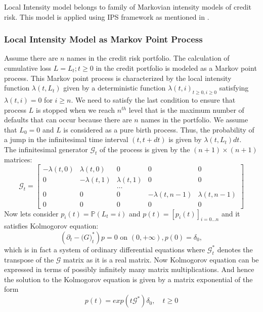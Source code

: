 Local Intensity model belongs to family of Markovian intensity models of credit risk.  This model is applied using IPS framework as mentioned in \cite{carmona2009importance}.
\subsubsection{Local Intensity Model as Markov Point Process}
 Assume there are $n$ names in the credit risk portfolio. The calculation of cumulative loss $L = {L_{t};t \geq 0}$ in the credit portfolio is modeled as a Markov point process. This Markov point process is characterized by the local intensity function $\lambda(t,L_{t})$ given by a deterministic function ${\lambda(t,i)}_{t \geq 0,i \geq 0}$ satisfying $\lambda(t,i) = 0$ for $ i \geq n$. We need to satisfy the last condition to ensure that process $L$ is stopped when we reach $n^{th}$ level that is the maximum number of defaults that can occur because there are $n$ names in the portfolio. We assume that $L_{0} = 0$ and $L$ is considered as a pure birth process. Thus, the probability of a jump in the infinitesimal time interval $(t,t+dt)$ is given by $\lambda(t,L_{t})dt$. \\
The infinitesimal generator $\mathcal{G}_{t}$ of the process is given by the $(n+1) \times (n+1)$ matrices: \\
\[\mathcal{G}_{t} = 
	\begin{bmatrix}
-\lambda(t,0)& \lambda(t,0) & 0 & 0 & 0 \\
0 & -\lambda(t,1)& \lambda(t,1)  & 0 & 0 \\
 & &\dots & & \\
 0 & 0 & 0 & -\lambda(t,n-1)& \lambda(t,n-1) \\
 0 & 0 & 0 & 0 & 0
\end{bmatrix}
\]
Now lets consider $p_{i}(t) = \mathbb{P}({L_{t}=i})$ and $p(t) = [p_{i}(t)]_{i=0 \dots n}$ and it satisfies Kolmogorov equation:
\begin{equation}
\left(\partial_{t} - \mathcal(G)_{t}^{*}\right)p = 0 \text{ on } (0,+\infty), p(0) = \delta_{0},
\end{equation} 
which is in fact a system of ordinary differential equations where $\mathcal{G}_{t}^{*}$ denotes the transpose of the $\mathcal{G}$ matrix as it is a real matrix. Now Kolmogorov equation can be expressed in terms of possibly infinitely many matrix multiplications. And hence the solution to the Kolmogorov equation is given by a matrix exponential  of the form \\
\begin{equation}
p(t) = exp(t\mathcal{G}^{*})\delta_{0}, \quad t \geq 0
\end{equation}
 
